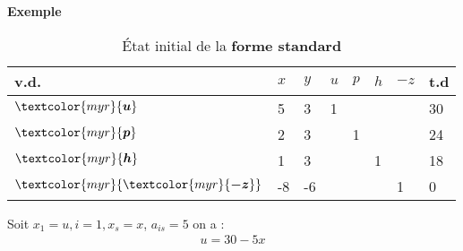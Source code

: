 \documentclass{report}
\begin{document}
\begin{multicols*}{2}
\noindent 
\textbf{Exemple}  
         \begin{table}[H]
                \begin{center}
                    \renewcommand{\arraystretch}{1.5}
                    \selectfont
                    \footnotesize
                        \begin{tabular}{|l|l l l l l |l|l|}
                        \arrayrulecolor{blue}
                        \hline
                        v.d. & $x$
                             & $y$ & $u$ & $p$ & $h$ & $-z$ & t.d 
                        \\
                        \hline
                        \arrayrulecolor{black}
                        \rowcolor{myg!40}
                        $\textcolor{myr}{\boldsymbol{u}}$     
                                & 5
                                & 3
                                & 1
                                & 
                                & &  &  30
                        \\
                        $\textcolor{myr}{\boldsymbol{p}}$     
                               & 2
                               & 3
                               & & 1
                               & & & 24 
                        \\
                        $\textcolor{myr}{\boldsymbol{h}}$     
                               & 1
                               & 3 
                               &  & 
                               &  1
                               & & 18 
                        \\ 
                        \hline
                        $\textcolor{myr}{\textcolor{myr}{\boldsymbol{-z}}}$ 
                                & -8
                                & -6
                                & 
                                & 
                                & 
                                & 1 & 0 
                        \\
                        \hline 



                        \end{tabular}
                \end{center}
                \caption{État initial de la \textbf{forme  standard}}
        \end{table}   
        Soit $x_1 = u, i = 1, x_s = x$, $a_{is} = 5$  on a :
\begin{align*}
    u = 30 - 5x
\end{align*}

\end{multicols*}
\end{document}
